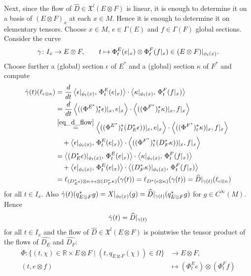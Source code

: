 \documentclass{amsart}
\theoremstyle{plain}
\newcommand{\R}{\mathbb{R}}
\newcommand{\mx}{\mathfrak{X}}
\newcommand{\an}[1]{\arrowvert_{#1}}
\begin{document}
\medskip
Next, since the flow of $\widehat{D}\in\mx^l(E\otimes F)$ is linear, it is enough to determine it on a basis of $(E\otimes F)_x$ at each $x\in M$.
Hence it is enough to determine it on elementary tensors.
Choose $x\in M$, $e\in\Gamma(E)$ and $f\in\Gamma(F)$ global sections. Consider the curve
\[ \gamma\colon I_x\to E\otimes F,\qquad  t\mapsto \Phi^E_t(e\an{x})\otimes \Phi^F_t(f\an{x}) \in (E\otimes F)\an{\phi_t(x)}.
\]
Choose further a (global) section $\epsilon$ of $E^*$ and a (global) section $\kappa$ of $F^*$ and compute
\begin{equation*}
\begin{split}
\dot \gamma(t)(\ell_{\epsilon\otimes \kappa})&=\frac{d}{dt}\left\langle\epsilon\an{\phi_t(x)}, \,\Phi^E_t(e\an{x})\right\rangle
\cdot \left\langle\kappa\an{\phi_t(x)}, \,\Phi^F_t(f\an{x})\right\rangle\\
&=\frac{d}{dt}\left\langle((\Phi^{E^*})^\star_{t}\epsilon)\an{x}, e\an{x}\right\rangle
\cdot \left\langle((\Phi^{F^*})^\star_{t}\kappa)\an{x}, f\an{x}\right\rangle\\
&\overset{\eqref{eq_d_flow}}{=}
\left\langle ((\Phi^{E^*})^\star_{t}(D_E^*\epsilon))\an{x}, e\an{x}\right\rangle
\cdot \left\langle((\Phi^{F^*})^\star_{t}\kappa)\an{x}, f\an{x}\right\rangle\\
&\quad +\left\langle\epsilon\an{\phi_t(x)}, \,\Phi^E_t(e\an{x})\right\rangle
\cdot \left\langle((\Phi^{F^*})^\star_{t}(D_F^*\kappa))\an{x}, f\an{x}\right\rangle\\
&=
\left\langle (D_E^*\epsilon)\an{\phi_t(x)},  \,\Phi^E_t(e\an{x})\right\rangle
\cdot  \left\langle\kappa\an{\phi_t(x)}, \,\Phi^F_t(f\an{x})\right\rangle\\
&\quad +\left\langle\epsilon\an{\phi_t(x)}, \,\Phi^E_t(e\an{x})\right\rangle
\cdot \left\langle(D_F^*\kappa)\an{\phi_t(x)}, \,\Phi^F_t(f\an{x})\right\rangle\\
&=\ell_{(D_E^*\epsilon)\otimes \kappa+\epsilon\otimes(D_F^*\kappa)}(\gamma(t))
=\ell_{D^*(\epsilon\otimes \kappa)}(\gamma(t))=\widehat{D}\an{\gamma(t)}(\ell_{\epsilon\otimes\kappa})
\end{split}
\end{equation*}
for all $t\in I_x$.
Also  $\dot \gamma(t)(q_{E\otimes F}^*g)=X\an{\phi_t(x)}(g)=\widehat{D}\an{\gamma(t)}(q_{E\otimes F}^*g)$
for $g\in C^\infty(M)$.
Hence 
\[\dot\gamma(t)=\widehat{D}\an{\gamma(t)}
\]
for all $t\in I_x$ and 
the flow of $\widehat{D}\in\mx^l(E\otimes F)$ is pointwise the tensor product of the flows of $\widehat{D_E}$ and $\widehat{D_F}$:
\begin{equation}\label{tensor_flow}
\begin{split}
 \Phi\colon  \{(t, \chi)\in\R\times E\otimes F\mid (t,q_{E\otimes F}(\chi))\in\Omega\}&\to E\otimes F, \\
 (t,e\otimes f)&\mapsto (\Phi_t^Ee)\otimes(\Phi_t^Ff)
\end{split}
\end{equation}
\end{document}
